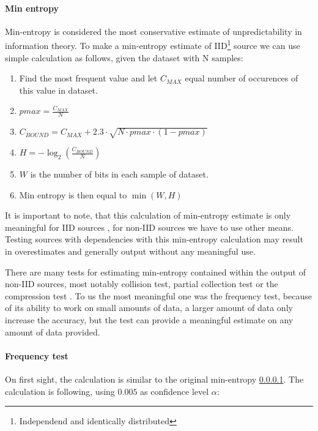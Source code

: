 \documentclass[
  print, %
  Table,   %
  nolof,     %
  nolot,     %
           oneside
]{fithesis3}
\begin{document}
  \paragraph{Min entropy}\label{par:min}
Min-entropy \cite{barker2012recommendation} is considered the most conservative estimate of unpredictability in information theory. To make a min-entropy estimate of IID\footnote{Independend and identically distributed} source we can use simple calculation as follows, given the dataset with N samples:


\begin{enumerate}
  \item Find the most frequent value and let $C_{MAX}$ equal number of occurences of this value in dataset.
  \item $pmax = \frac{C_{MAX}}{N}$
  \item $C_{BOUND}=C_{MAX} + 2.3 \cdot \sqrt{N \cdot pmax \cdot ( 1- pmax)}$
  \item $H = - \log_2 (\frac{C_{BOUND}}{N}) $
  \item $W$ is the number of bits in each sample of dataset.
  \item Min entropy is then equal to $\min(W, H)$

\end{enumerate}

It is important to note, that this calculation of min-entropy estimate is only meaningful for IID sources \cite{barker2012recommendation}, for non-IID sources we have to use other means. Testing sources with dependencies with this min-entropy calculation may result in overestimates and generally output without any meaningful use.

There are many tests for estimating min-entropy contained within the output of non-IID sources, most notably collision test, partial collection test or the compression test \cite{barker2012recommendation}. To us the most meaningful one was the frequency test\cite{barker2012recommendation}, because of its ability to work on small amounts of data, a larger amount of data only increase the accuracy, but the test can provide a meaningful estimate on any amount of data provided.

\paragraph{Frequency test}\label{par:freq}
  On first sight, the calculation is similar to the original min-entropy \ref{par:min}. The calculation is following, using $0.005$ as confidence level $\alpha$:
\end{document}
